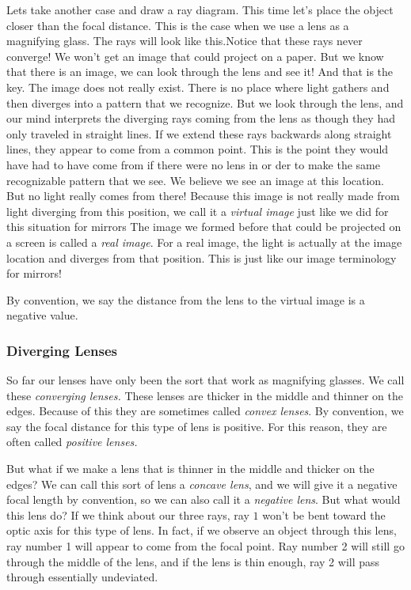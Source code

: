 \documentclass{article}
\begin{document}
Lets take another case and draw a ray diagram. This time let's place the
object closer than the focal distance. This is the case when we use a lens
as a magnifying glass. The rays will look like this.Notice that these rays never
converge! We won't get an image that could project on a paper. But we know
that there is an image, we can look through the lens and see it! And that is
the key. The image does not really exist. There is no place where light
gathers and then diverges into a pattern that we recognize. But we look
through the lens, and our mind interprets the diverging rays coming from the
lens as though they had only traveled in straight lines. If we extend these
rays backwards along straight lines, they appear to come from a common
point. This is the point they would have had to have come from if there were
no lens in or der to make the same recognizable pattern that we see. We
believe we see an image at this location. But no light really comes from
there! Because this image is not really made from light diverging from this
position, we call it a \emph{virtual image} just like we did for this
situation for mirrors The image we formed before that could be projected on
a screen is called a \emph{real image}. For a real image, the light is
actually at the image location and diverges from that position. This is just
like our image terminology for mirrors!

By convention, we say the distance from the lens to the virtual image is a
negative value.

\subsubsection{Diverging Lenses}

So far our lenses have only been the sort that work as magnifying glasses.
We call these \emph{converging lenses.} These lenses are thicker in the
middle and thinner on the edges. Because of this they are sometimes called 
\emph{convex lenses}. By convention, we say the focal distance for this type
of lens is positive. For this reason, they are often called \emph{positive
lenses.}

But what if we make a lens that is thinner in the middle and thicker on the
edges? We can call this sort of lens a \emph{concave lens}, and we will give
it a negative focal length by convention, so we can also call it a \emph{%
negative lens}. But what would this lens do? If we think about our three
rays, ray $1$ won't be bent toward the optic axis for this type of lens. In
fact, if we observe an object through this lens, ray number 1 will appear to
come from the focal point. Ray number 2 will still go through the middle of
the lens, and if the lens is thin enough, ray 2 will pass through
essentially undeviated.
\end{document}
